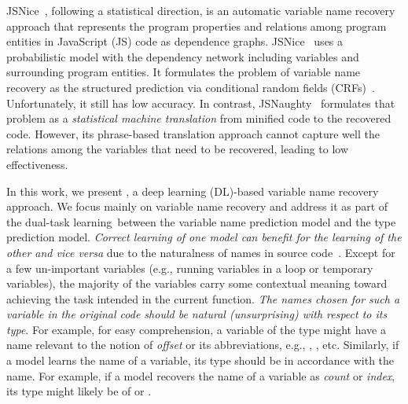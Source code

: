 JSNice~\cite{JSNice2015}, following a statistical direction, is an
automatic variable name recovery approach that represents the program
properties and relations among program entities in JavaScript (JS)
code as dependence graphs. JSNice~\cite{JSNice2015} uses a
probabilistic model with the dependency network including
variables and surrounding program entities. It formulates the problem
of variable name recovery as the structured prediction via conditional
random fields (CRFs)~\cite{JSNice2015}. Unfortunately, it still has
low accuracy.
%
In contrast, JSNaughty~\cite{JSNaughty2017} formulates
that problem as a {\em statistical machine translation} from
minified code to the recovered code. However, its
phrase-based translation approach cannot capture well the relations
among the variables that need to be recovered, leading to low
effectiveness.




In this work, we present {\tool}, a deep learning (DL)-based variable
name recovery approach. We focus mainly on variable name recovery and
address it as part of the dual-task learning~between the variable name
prediction model and the type prediction model. {\em Correct learning
  of one model can benefit for the learning of the other and vice
  versa} due to the naturalness of names in source
code~\cite{hindle-icse12}.
%
Except for a few un-important variables (e.g., running variables in a
loop or temporary variables), the majority of the variables carry some
contextual meaning toward achieving the task intended in the current
function.
%
{\em The names chosen for such a variable in the original code should
  be natural (unsurprising) with respect to its type}.
For example, for easy comprehension, a variable of the type
 might have a name relevant to the notion of {\em offset}
or its abbreviations, e.g., , , etc.
Similarly, if a model learns the name of a variable, its type should
be in accordance with the name. For example, if a model recovers the
name of a variable as {\em count} or {\em index}, its type might
likely be of  or .

